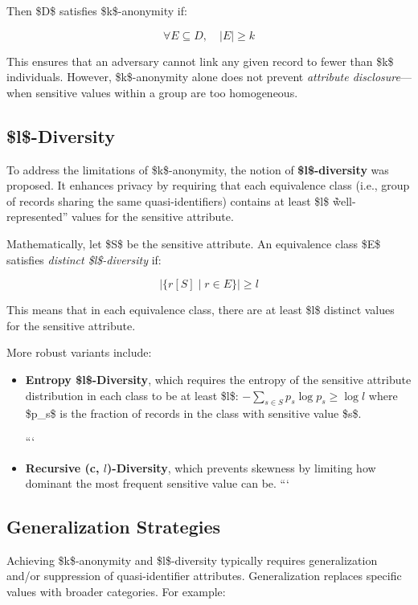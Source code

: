 \documentclass{article}
\begin{document}
Then \$D\$ satisfies \$k\$-anonymity if:

$$
\forall E \subseteq D, \quad |E| \geq k
$$

This ensures that an adversary cannot link any given record to fewer than \$k\$ individuals. However, \$k\$-anonymity alone does not prevent \textit{attribute disclosure}—when sensitive values within a group are too homogeneous.

\subsection{\$l\$-Diversity}

To address the limitations of \$k\$-anonymity, the notion of \textbf{\$l\$-diversity} was proposed. It enhances privacy by requiring that each equivalence class (i.e., group of records sharing the same quasi-identifiers) contains at least \$l\$ \`\`well-represented'' values for the sensitive attribute.

Mathematically, let \$S\$ be the sensitive attribute. An equivalence class \$E\$ satisfies \textit{distinct \$l\$-diversity} if:

$$
|\{ r[S] \mid r \in E \}| \geq l
$$

This means that in each equivalence class, there are at least \$l\$ distinct values for the sensitive attribute.

More robust variants include:
\begin{itemize}
\item \textbf{Entropy \$l\$-Diversity}, which requires the entropy of the sensitive attribute distribution in each class to be at least \$\log l\$:
$     -\sum_{s \in S} p_s \log p_s \geq \log l
    $
where \$p\_s\$ is the fraction of records in the class with sensitive value \$s\$.

```
\item \textbf{Recursive (c, $l$)-Diversity}, which prevents skewness by limiting how dominant the most frequent sensitive value can be.
```

\end{itemize}

\subsection{Generalization Strategies}

Achieving \$k\$-anonymity and \$l\$-diversity typically requires generalization and/or suppression of quasi-identifier attributes. Generalization replaces specific values with broader categories. For example:
\begin{itemize}
\item Age: 23 \$\rightarrow\$ \[21--30]
\item ZIP Code: 12345 \$\rightarrow\$ 123\textbf{\*\*}
\end{itemize}
\end{document}
